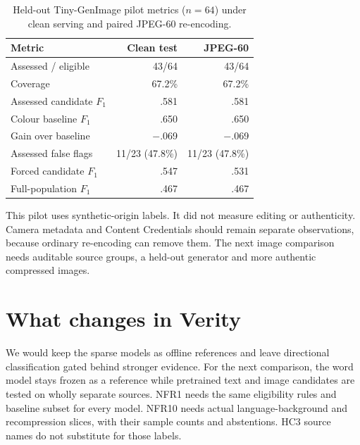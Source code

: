 \documentclass[11pt]{article}
\begin{document}
\begin{table}[h]
\centering
\footnotesize
\setlength{\tabcolsep}{4pt}
\begin{tabular}{@{}lrr@{}}
\toprule
Metric & Clean test & JPEG-60 \\
\midrule
Assessed / eligible & 43/64 & 43/64 \\
Coverage & 67.2\% & 67.2\% \\
Assessed candidate $F_1$ & .581 & .581 \\
Colour baseline $F_1$ & .650 & .650 \\
Gain over baseline & $-$.069 & $-$.069 \\
Assessed false flags & 11/23 (47.8\%) & 11/23 (47.8\%) \\
Forced candidate $F_1$ & .547 & .531 \\
Full-population $F_1$ & .467 & .467 \\
\bottomrule
\end{tabular}
\caption{Held-out Tiny-GenImage pilot metrics ($n=64$) under clean serving and paired JPEG-60 re-encoding.}
\label{tab:image-results}
\end{table}

This pilot uses synthetic-origin labels. It did not measure editing or authenticity. Camera metadata and Content Credentials should remain separate observations, because ordinary re-encoding can remove them. The next image comparison needs auditable source groups, a held-out generator and more authentic compressed images.

\section{What changes in Verity}

We would keep the sparse models as offline references and leave directional classification gated behind stronger evidence. For the next comparison, the word model stays frozen as a reference while pretrained text and image candidates are tested on wholly separate sources. NFR1 needs the same eligibility rules and baseline subset for every model. NFR10 needs actual language-background and recompression slices, with their sample counts and abstentions. HC3 source names do not substitute for those labels.
\end{document}

